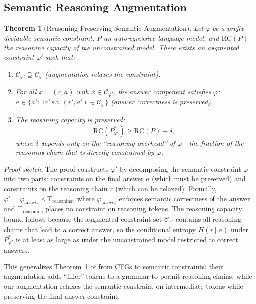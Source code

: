 \documentclass[twoside,11pt]{article}
\newtheorem{theorem}{Theorem}[section]
\newcommand{\Constraint}{\mathcal{C}}
\begin{document}
\subsection{Semantic Reasoning Augmentation}
\label{sec:reasoning-augmentation}

\begin{theorem}[Reasoning-Preserving Semantic Augmentation]
\label{thm:reasoning-augmentation}
Let $\varphi$ be a prefix-decidable semantic constraint, $P$ an
autoregressive language model, and $\mathrm{RC}(P)$ the reasoning capacity
of the unconstrained model. There exists an \emph{augmented constraint}
$\varphi'$ such that:
\begin{enumerate}
    \item $\Constraint_{\varphi'} \supseteq \Constraint_\varphi$
    (augmentation relaxes the constraint).
    \item For all $x = (r, a)$ with $x \in \Constraint_{\varphi'}$, the
    answer component satisfies $\varphi$: $a \in \{a' : \exists\, r'\,
    \text{s.t.}\, (r', a') \in \Constraint_\varphi\}$ (answer correctness
    is preserved).
    \item The reasoning capacity is preserved:
    \begin{equation}
    \label{eq:augmented-reasoning}
    \mathrm{RC}(P^*_{\varphi'}) \geq \mathrm{RC}(P) - \delta,
    \end{equation}
    where $\delta$ depends only on the ``reasoning overhead'' of
    $\varphi$---the fraction of the reasoning chain that is directly
    constrained by $\varphi$.
\end{enumerate}
\end{theorem}

\begin{proof}[Proof sketch]
The proof constructs $\varphi'$ by decomposing the semantic constraint
$\varphi$ into two parts: constraints on the final answer $a$ (which must be
preserved) and constraints on the reasoning chain $r$ (which can be relaxed).
Formally, $\varphi' = \varphi_{\mathrm{answer}} \wedge \top_{\mathrm{reasoning}}$,
where $\varphi_{\mathrm{answer}}$ enforces semantic correctness of the answer
and $\top_{\mathrm{reasoning}}$ places no constraint on reasoning tokens. The
reasoning capacity bound follows because the augmented constraint set
$\Constraint_{\varphi'}$ contains all reasoning chains that lead to a correct
answer, so the conditional entropy $H(r \mid a)$ under $P^*_{\varphi'}$ is
at least as large as under the unconstrained model restricted to correct
answers.

This generalizes Theorem~1 of \citet{banerjee2025crane} from CFGs to
semantic constraints: their augmentation adds ``filler'' tokens to a grammar
to permit reasoning chains, while our augmentation relaxes the semantic
constraint on intermediate tokens while preserving the final-answer
constraint.
\end{proof}
\end{document}
